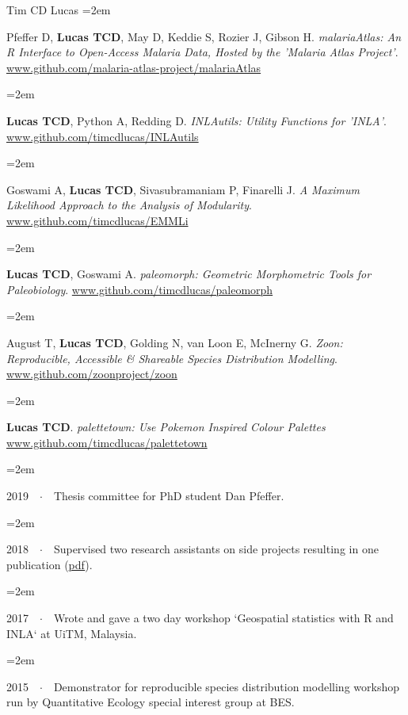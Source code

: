 \documentclass{scrartcl}
\newcommand{\Description}[1]{\hangindent=2em\hangafter=0\noindent\raggedright\footnotesize{#1}\par\normalsize\vspace{1em}} %
\begin{document}
\begin{cv}{Tim {\Large CD} Lucas}
\Description{Pfeffer D, \textbf{Lucas TCD}, May D, Keddie S, Rozier J, Gibson H. \emph{malariaAtlas: An R Interface to Open-Access Malaria Data, Hosted by the 'Malaria Atlas Project'}. \url{www.github.com/malaria-atlas-project/malariaAtlas}}

\Description{\textbf{Lucas TCD}, Python A, Redding D. \emph{INLAutils: Utility Functions for 'INLA'}. \url{www.github.com/timcdlucas/INLAutils}}

\Description{Goswami A, \textbf{Lucas TCD}, Sivasubramaniam P, Finarelli J. \emph{A Maximum Likelihood Approach to the Analysis of Modularity}. \url{www.github.com/timcdlucas/EMMLi}}

\Description{\textbf{Lucas TCD}, Goswami A. \emph{paleomorph: Geometric Morphometric Tools for Paleobiology}. \url{www.github.com/timcdlucas/paleomorph}}

\Description{August T, \textbf{Lucas TCD}, Golding N, van Loon E, McInerny G. \emph{Zoon: Reproducible, Accessible \& Shareable Species Distribution Modelling}. \url{www.github.com/zoonproject/zoon}}

\Description{\textbf{Lucas TCD}. \emph{palettetown: Use Pokemon Inspired Colour Palettes} \url{www.github.com/timcdlucas/palettetown}}


\vspace{1em} %

{\color{Maroon}}\vspace{1em}

\Description{2019\ \ $\cdotp$\ \ Thesis committee for PhD student Dan Pfeffer.}
\vspace{-0.5em} %

\Description{2018\ \ $\cdotp$\ \ Supervised two research assistants on side projects resulting in one publication (\href{https://malariajournal.biomedcentral.com/track/pdf/10.1186/s12936-018-2500-5}{pdf}).}
\vspace{-0.5em} %

\Description{2017\ \ $\cdotp$\ \ Wrote and gave a two day workshop `Geospatial statistics with R and INLA` at UiTM, Malaysia.}
\vspace{-0.5em} %


\Description{2015\ \ $\cdotp$\ \ Demonstrator for reproducible species distribution modelling workshop run by Quantitative Ecology special interest group at BES.}
\vspace{-0.5em} %


\end{cv}
\end{document}
